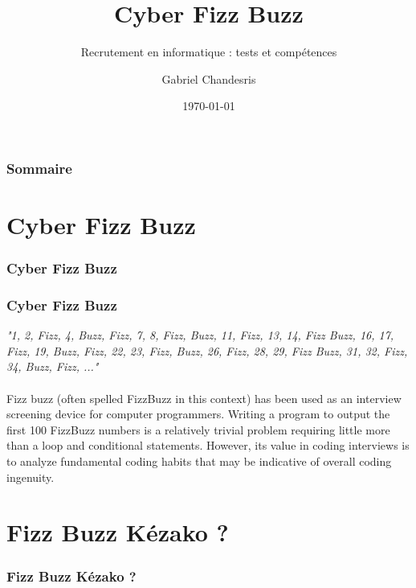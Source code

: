 \documentclass[slidetop,11pt]{beamer}
\title{Cyber Fizz Buzz}
\subtitle{Recrutement en informatique : tests et comp{\'e}tences}
\author{Gabriel Chandesris}
\institute{\emph{to be defined}}
\date{\today} %
\begin{document}
\frame[plain]{\titlepage } 
%


\begin{frame}
	\frametitle{Sommaire}
	\small \tableofcontents[hideallsubsections]
\end{frame} 

\section{Cyber Fizz Buzz}
\begin{frame}
	\frametitle{Cyber Fizz Buzz}
	\tableofcontents[sections=1,currentsection,subsectionstyle=show/shaded/hide] %
\end{frame} 

\begin{frame}
	\frametitle{Cyber Fizz Buzz}
	
	\emph{"1, 2, Fizz, 4, Buzz, Fizz, 7, 8, Fizz, Buzz, 11, Fizz, 13, 14, Fizz Buzz, 16, 17, Fizz, 19, Buzz, Fizz, 22, 23, Fizz, Buzz, 26, Fizz, 28, 29, Fizz Buzz, 31, 32, Fizz, 34, Buzz, Fizz, ..."}~\\~\\
	
	
	Fizz buzz (often spelled FizzBuzz in this context) has been used as an interview screening device for computer programmers. Writing a program to output the first 100 FizzBuzz numbers is a relatively trivial problem requiring little more than a loop and conditional statements. However, its value in coding interviews is to analyze fundamental coding habits that may be indicative of overall coding ingenuity.

\end{frame} 

\section{Fizz Buzz K{\'e}zako ?}
\begin{frame}
	\frametitle{Fizz Buzz K{\'e}zako ?}
	\tableofcontents[sections=2,currentsection,subsectionstyle=show/shaded/hide]
\end{frame} 

\def\titleTentativeDefinitionCyberFizzBuzz{Cyber Fizz Buzz : tentative de d{\'e}finition}
\end{document}

